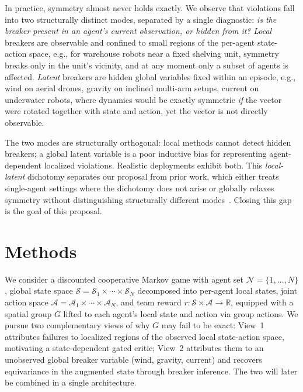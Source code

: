 \documentclass[11pt]{article}
\begin{document}
In practice, symmetry almost never holds exactly. We observe that violations fall into two structurally distinct modes, separated by a single diagnostic: \emph{is the breaker present in an agent's current observation, or hidden from it?} \emph{Local} breakers are observable and confined to small regions of the per-agent state-action space, e.g., for warehouse robots near a fixed shelving unit, symmetry breaks only in the unit's vicinity, and at any moment only a subset of agents is affected. \emph{Latent} breakers are hidden global variables fixed within an episode, e.g., wind on aerial drones, gravity on inclined multi-arm setups, current on underwater robots, where dynamics would be exactly symmetric \emph{if} the vector were rotated together with state and action, yet the vector is not directly observable.

The two modes are structurally orthogonal: local methods cannot detect hidden breakers; a global latent variable is a poor inductive bias for representing agent-dependent localized violations. Realistic deployments exhibit both. This \emph{local-latent} dichotomy separates our proposal from prior work, which either treats single-agent settings where the dichotomy does not arise or globally relaxes symmetry without distinguishing structurally different modes~\citep{finzi2021rpp,wang2022approx,romero2022partial,vanderouderaa2022relaxing,hofgard2024relaxed,park2025approximate}. Closing this gap is the goal of this proposal.

\section{Methods}
We consider a discounted cooperative Markov game with agent set $\mathcal{N} = \{1, \dots, N\}$,
global state space $\mathcal{S}=\mathcal{S}_1 \times \cdots \times \mathcal{S}_N$ decomposed into per-agent local states,
joint action space $\mathcal{A} = \mathcal{A}_1 \times \cdots \times \mathcal{A}_N$,
and team reward $r\colon \mathcal{S} \times \mathcal{A} \to \mathbb{R}$, 
equipped with a spatial group $G$ lifted to each agent's local state and action via group actions. We pursue two complementary views of why $G$ may fail to be exact: View~1 attributes failures to localized regions of the observed local state-action space, motivating a state-dependent gated critic; View~2 attributes them to an unobserved global breaker variable (wind, gravity, current) and recovers equivariance in the augmented state through breaker inference. The two will later be combined in a single architecture.
\end{document}
